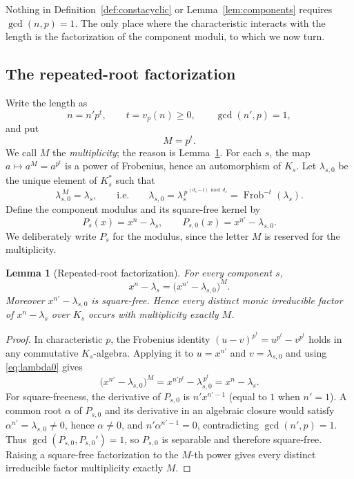 \documentclass[preprint,12pt,a4paper]{elsarticle}
\newcommand{\Frob}{\operatorname{Frob}}
\newtheorem{lemma}[theorem]{Lemma}
\theoremstyle{definition}
\theoremstyle{remark}
\begin{document}
Nothing in Definition~\ref{def:constacyclic} or Lemma~\ref{lem:components}
requires $\gcd(n,p)=1$.  The only place where the characteristic interacts with
the length is the factorization of the component moduli, to which we now turn.

\subsection{The repeated-root factorization}\label{sec:factorisation}

Write the length as
\[
n=n'p^t,\qquad t=v_p(n)\geq0,\qquad \gcd(n',p)=1,
\]
and put
\[
M=p^t .
\]
We call $M$ the \emph{multiplicity}; the reason is Lemma~\ref{lem:factorisation}.
For each $s$, the map $a\mapsto a^M=a^{p^t}$ is a power of Frobenius, hence an
automorphism of $K_s$.  Let $\lambda_{s,0}$ be the unique element of $K_s^\ast$
such that
\begin{equation}\label{eq:lambda0}
\lambda_{s,0}^{\,M}=\lambda_s,
\qquad\text{i.e.}\qquad
\lambda_{s,0}=\lambda_s^{\,p^{\,(d_s-t)\bmod d_s}}=\Frob^{-t}(\lambda_s).
\end{equation}
Define the component modulus and its square-free kernel by
\[
P_s(x)=x^n-\lambda_s,\qquad P_{s,0}(x)=x^{n'}-\lambda_{s,0}.
\]
We deliberately write $P_s$ for the modulus, since the letter $M$ is reserved
for the multiplicity.

\begin{lemma}[Repeated-root factorization]\label{lem:factorisation}
For every component $s$,
\begin{equation}\label{eq:factorisation}
x^n-\lambda_s=\bigl(x^{n'}-\lambda_{s,0}\bigr)^M .
\end{equation}
Moreover $x^{n'}-\lambda_{s,0}$ is square-free.  Hence every distinct monic
irreducible factor of $x^n-\lambda_s$ over $K_s$ occurs with multiplicity
exactly $M$.
\end{lemma}

\begin{proof}
In characteristic $p$, the Frobenius identity
$(u-v)^{p^t}=u^{p^t}-v^{p^t}$ holds in any commutative $K_s$-algebra.  Applying
it to $u=x^{n'}$ and $v=\lambda_{s,0}$ and using \eqref{eq:lambda0} gives
\[
\bigl(x^{n'}-\lambda_{s,0}\bigr)^M
   =x^{n'p^t}-\lambda_{s,0}^{\,p^t}=x^n-\lambda_s .
\]
For square-freeness, the derivative of $P_{s,0}$ is $n'x^{n'-1}$ (equal to $1$
when $n'=1$).  A common root $\alpha$ of $P_{s,0}$ and its derivative in an
algebraic closure would satisfy $\alpha^{n'}=\lambda_{s,0}\neq0$, hence
$\alpha\neq0$, and $n'\alpha^{n'-1}=0$, contradicting $\gcd(n',p)=1$.
Thus $\gcd(P_{s,0},P_{s,0}')=1$, so $P_{s,0}$ is separable and therefore
square-free.  Raising a square-free factorization to the $M$-th power gives
every distinct irreducible factor multiplicity exactly $M$.
\end{proof}
\end{document}
